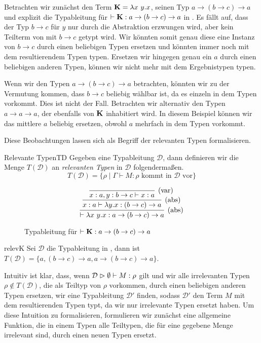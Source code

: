 Betrachten wir zunächst den Term $\textbf{K}=\lambda x~y.x$, seinen Typ $a \to (b\to c) \to a$ und explizit die Typableitung für $\vdash \textbf{K} : a\to (b\to c)\to a$ in . Es fällt auf, dass der Typ $b\to c$ für $y$ nur durch die Abstraktion erzwungen wird, aber kein Teilterm von \tK{} mit $b\to c$ getypt wird. Wir könnten somit genau diese eine Instanz von $b\to c$ durch einen beliebigen Typen ersetzen und könnten \tK{} immer noch mit dem resultierendem Typen typen. Ersetzen wir hingegen genau ein $a$ durch einen beliebigen anderen Typen, können wir \tK{} nicht mehr mit dem Ergebnistypen typen. 
\begin{remark}
    Wenn wir den Typen $a \to (b\to c)\to a$ betrachten, könnten wir zu der Vermutung kommen, dass $b\to c$ beliebig wählbar ist, da es einzeln in dem Typen vorkommt. Dies ist nicht der Fall. Betrachten wir alternativ den Typen $a\to a\to a$, der ebenfalls von $\textbf{K}$ inhabitiert wird. In diesem Beispiel können wir das mittlere $a$ beliebig ersetzen, obwohl $a$ mehrfach in dem Typen vorkommt.   
\end{remark}

Diese Beobachtungen lassen sich als Begriff der relevanten Typen formalisieren.

\begin{definition}{Relevante Typen}{TD}
    Gegeben eine Typableitung $\mathcal{D}$, dann definieren wir die Menge $T(\mathcal{D})$ an \emph{relevanten Typen} in $\mathcal{D}$ folgendermaßen.
    \[T(\mathcal{D})=\{\rho\mid \Gamma\vdash M:\rho \text{ kommt in }\mathcal{D}\text{ vor}\}\]
\end{definition}
\begin{figure}
    \[
    \infer[\text{(abs)}]{\vdash \lambda x~y.x:a\to (b\to c) \to a}{
        \infer[\text{(abs)}]{x:a\vdash \lambda y.x : (b\to c)\to a}{\infer[\text{(var)}]{x:a, y:b\to c \vdash x : a}{}}}
    \]
    \caption{Typableitung für  $\vdash \textbf{K}:a \to (b\to c) \to a$}
    \label{fig:typeKb}
\end{figure}

\begin{example}{}{relevK}
    Sei $\mathcal{D}$ die Typableitung in , dann ist $T(\mathcal{D}) = \{a, (b\to c)\to a, a\to (b\to c) \to a\}$.
\end{example}

Intuitiv ist klar, dass, wenn $\mathcal{D}\vartriangleright\emptyset\vdash M:\rho$ gilt und wir alle irrelevanten Typen $\rho\notin T(\mathcal{D})$, die als Teiltyp von $\rho$ vorkommen, durch einen beliebigen anderen Typen ersetzen, wir eine Typableitung $\mathcal{D}'$ finden, sodass $\mathcal{D}'$ den Term $M$ mit dem resultierenden Typen typt, da wir nur irrelevante Typen ersetzt haben. Um diese Intuition zu formalisieren, formulieren wir zunächst eine allgemeine Funktion, die in einem Typen alle Teiltypen, die für eine gegebene Menge irrelevant sind, durch einen neuen Typen ersetzt.

